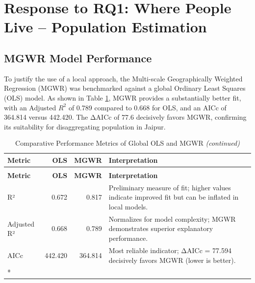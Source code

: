 \documentclass[
  12pt,
  oneside]{book}
\begin{document}
\section{Response to RQ1: Where People Live -- Population Estimation}\label{response-to-rq1-where-people-live-population-estimation}

\subsection{MGWR Model Performance}\label{mgwr-model-performance}

To justify the use of a local approach, the Multi-scale Geographically Weighted Regression (MGWR) was benchmarked against a global Ordinary Least Squares (OLS) model. As shown in Table \ref{tab:modelcomparison}, MGWR provides a substantially better fit, with an Adjusted \(R^{2}\) of 0.789 compared to 0.668 for OLS, and an AICc of 364.814 versus 442.420. The ΔAICc of 77.6 decisively favors MGWR, confirming its suitability for disaggregating population in Jaipur.

\setlength{\tabcolsep}{4pt}

\begingroup\fontsize{8.8}{10.8}\selectfont

\begin{longtable}[t]{p{2.5cm}rrp{8cm}}
\caption{\label{tab:modelcomparison}Comparative Performance Metrics of Global OLS and MGWR}\\
\toprule
\textbf{Metric} & \textbf{OLS} & \textbf{MGWR} & \textbf{Interpretation}\\
\midrule
\endfirsthead
\caption[]{\label{tab:modelcomparison}Comparative Performance Metrics of Global OLS and MGWR \textit{(continued)}}\\
\toprule
\textbf{Metric} & \textbf{OLS} & \textbf{MGWR} & \textbf{Interpretation}\\
\midrule
\endhead

\endfoot
\bottomrule
\endlastfoot
R² & 0.672 & 0.817 & Preliminary measure of fit; higher values indicate improved fit but can be inflated in local models.\\
Adjusted R² & 0.668 & 0.789 & Normalizes for model complexity; MGWR demonstrates superior explanatory performance.\\
AICc & 442.420 & 364.814 & Most reliable indicator; ΔAICc = 77.594 decisively favors MGWR (lower is better).\\*
\end{longtable}
\endgroup{}

\setlength{\tabcolsep}{6pt}
\end{document}
